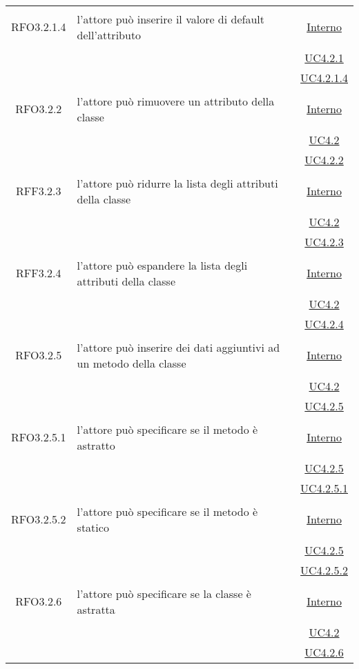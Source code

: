 \begin{longtable}{|c|>{\centering}m{7cm}|c|}
\hypertarget{RFO3.2.1.4}{RFO3.2.1.4} & l'attore può inserire il valore di default dell'attributo & \hyperlink{Interno}{Interno}\\
& &\hyperref[UC4.2.1]{UC4.2.1}\\
& &\hyperref[UC4.2.1.4]{UC4.2.1.4}\\ \hline

\hypertarget{RFO3.2.2}{RFO3.2.2} & l'attore può rimuovere un attributo della classe & \hyperlink{Interno}{Interno}\\
& &\hyperref[UC4.2]{UC4.2}\\
& &\hyperref[UC4.2.2]{UC4.2.2}\\ \hline

\hypertarget{RFF3.2.3}{RFF3.2.3} & l'attore può ridurre la lista degli attributi della classe & \hyperlink{Interno}{Interno}\\
& &\hyperref[UC4.2]{UC4.2}\\
& &\hyperref[UC4.2.3]{UC4.2.3}\\ \hline

\hypertarget{RFF3.2.4}{RFF3.2.4} & l'attore può espandere la lista degli attributi della classe & \hyperlink{Interno}{Interno}\\
& &\hyperref[UC4.2]{UC4.2}\\
& &\hyperref[UC4.2.4]{UC4.2.4}\\ \hline

\hypertarget{RFO3.2.5}{RFO3.2.5} & l'attore può inserire dei dati aggiuntivi ad un metodo della classe & \hyperlink{Interno}{Interno}\\
& &\hyperref[UC4.2]{UC4.2}\\
& &\hyperref[UC4.2.5]{UC4.2.5}\\ \hline

\hypertarget{RFO3.2.5.1}{RFO3.2.5.1} & l'attore può specificare se il metodo è astratto & \hyperlink{Interno}{Interno}\\
& &\hyperref[UC4.2.5]{UC4.2.5}\\
& &\hyperref[UC4.2.5.1]{UC4.2.5.1}\\ \hline

\hypertarget{RFO3.2.5.2}{RFO3.2.5.2} & l'attore può specificare se il metodo è statico & \hyperlink{Interno}{Interno}\\
& &\hyperref[UC4.2.5]{UC4.2.5}\\
& &\hyperref[UC4.2.5.2]{UC4.2.5.2}\\ \hline

\hypertarget{RFO3.2.6}{RFO3.2.6} & l'attore può specificare se la classe è astratta & \hyperlink{Interno}{Interno}\\
& &\hyperref[UC4.2]{UC4.2}\\
& &\hyperref[UC4.2.6]{UC4.2.6}\\ \hline


\end{longtable}
